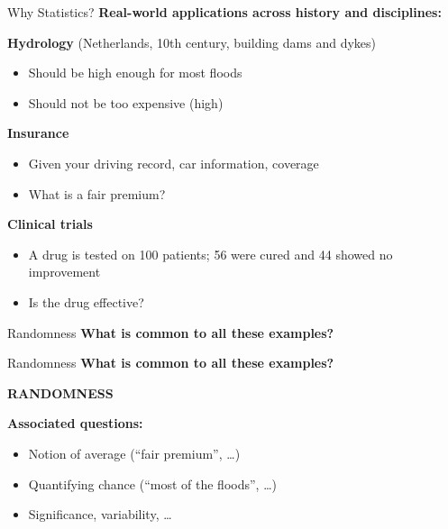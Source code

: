 \documentclass[aspectratio=169]{beamer}
\begin{document}
\begin{frame}{Why Statistics?}
\textbf{Real-world applications across history and disciplines:}

\vspace{0.3cm}

\textbf{Hydrology} (Netherlands, 10th century, building dams and dykes)
\begin{itemize}
    \item Should be high enough for most floods
    \item Should not be too expensive (high)
\end{itemize}

\textbf{Insurance}
\begin{itemize}
    \item Given your driving record, car information, coverage
    \item What is a fair premium?
\end{itemize}

\textbf{Clinical trials}
\begin{itemize}
    \item A drug is tested on 100 patients; 56 were cured and 44 showed no improvement
    \item Is the drug effective?
\end{itemize}
\end{frame}

\begin{frame}{Randomness}
\textbf{What is common to all these examples?}
\vspace{5cm}
\end{frame}

\begin{frame}{Randomness}
\textbf{What is common to all these examples?}
\vspace{1cm}

\centering
{\LARGE \textcolor{sorbonneblue}{\textbf{RANDOMNESS}}}

\vspace{1cm}

\textbf{Associated questions:}
\begin{itemize}
    \item Notion of average (``fair premium'', \dots)
    \item Quantifying chance (``most of the floods'', \dots)
    \item Significance, variability, \dots
\end{itemize}
\end{frame}
\end{document}

